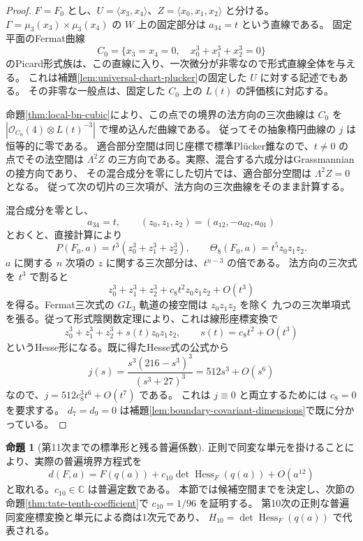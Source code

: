 \documentclass[a4paper,11pt]{ltjsarticle}
\theoremstyle{definition}
\newtheorem{theorem}{命題}[section]
\newcommand{\CC}{\mathbb C}
\newcommand{\OO}{\mathcal O}
\begin{document}
\begin{proof}
$F=F_0$ とし、$U=\langle x_3,x_4\rangle$、$Z=\langle x_0,x_1,x_2\rangle$ と分ける。
$\Gamma=\mu_3(x_3)\times\mu_3(x_4)$ の $W$ 上の固定部分は $a_{34}=t$ という直線である。
固定平面のFermat曲線
\[
 C_0=\{x_3=x_4=0,\quad x_0^3+x_1^3+x_2^3=0\}
\]
のPicard形式族は、この直線に入り、一次微分が非零なので形式直線全体を与える。
これは補題\ref{lem:universal-chart-plucker}の固定した $U$ に対する記述でもある。
その非零な一般点は、固定した $C_0$ 上の $L(t)$ の評価核に対応する。

命題\ref{thm:local-bn-cubic}により、この点での境界の法方向の三次曲線は
$C_0$ を $|\OO_{C_0}(4)\otimes L(t)^{-3}|$ で埋め込んだ曲線である。
従ってその抽象楕円曲線の $j$ は恒等的に零である。
適合部分空間は同じ座標で標準Pl\"ucker錐なので、$t\ne0$ の点でその法空間は
$\Lambda^2Z$ の三方向である。実際、混合する六成分はGrassmannianの接方向であり、
その混合成分を零にした切片では、適合部分空間は $\Lambda^2Z=0$ となる。
従って次の切片の三次項が、法方向の三次曲線をそのまま計算する。

混合成分を零とし、
\[
 a_{34}=t,\qquad (z_0,z_1,z_2)=(a_{12},-a_{02},a_{01})
\]
とおくと、直接計算により
\begin{equation}\label{eq:boundary-hesse-slice}
 P(F_0,a)=t^3(z_0^3+z_1^3+z_2^3),\qquad
 \Theta_8(F_0,a)=t^5z_0z_1z_2.
\end{equation}
$a$ に関する $n$ 次項の $z$ に関する三次部分は、$t^{n-3}$ の倍である。
法方向の三次式を $t^3$ で割ると
\[
 z_0^3+z_1^3+z_2^3+c_8t^2z_0z_1z_2+O(t^3)
\]
を得る。Fermat三次式の $GL_3$ 軌道の接空間は $z_0z_1z_2$ を除く
九つの三次単項式を張る。従って形式陰関数定理により、これは線形座標変換で
\[
 z_0^3+z_1^3+z_2^3+s(t)z_0z_1z_2,
 \qquad s(t)=c_8t^2+O(t^3)
\]
というHesse形になる。既に得たHesse式の公式から
\[
 j(s)=\frac{s^3(216-s^3)^3}{(s^3+27)^3}
     =512s^3+O(s^6)
\]
なので、$j=512c_8^3t^6+O(t^7)$ である。
これは $j\equiv0$ と両立するためには $c_8=0$ を要求する。
$d_7=d_9=0$ は補題\ref{lem:boundary-covariant-dimensions}で既に分かっている。
\end{proof}

\begin{theorem}[第11次までの標準形と残る普遍係数]\label{thm:boundary-eleven-jet}
正則で同変な単元を掛けることにより、実際の普遍境界方程式を
\begin{equation}\label{eq:boundary-eleven-jet}
 d(F,a)=F(q(a))+
 c_{10}\det\operatorname{Hess}_F(q(a))+O(a^{12})
\end{equation}
と取れる。$c_{10}\in\CC$ は普遍定数である。
本節では候補空間までを決定し、次節の命題\ref{thm:tate-tenth-coefficient}で
$c_{10}=1/96$ を証明する。
第10次の正則な普遍同変座標変換と単元による商は1次元であり、
$H_{10}=\det\operatorname{Hess}_F(q(a))$ で代表される。
\end{theorem}
\end{document}
